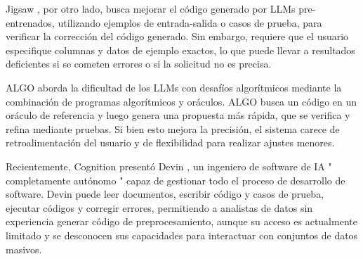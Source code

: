 Jigsaw \cite{jain2022jigsaw}, por otro lado, busca mejorar el código generado por LLMs pre-entrenados, utilizando ejemplos de entrada-salida o casos de prueba, para verificar la corrección del código generado. Sin embargo, requiere que el usuario especifique columnas y datos de ejemplo exactos, lo que puede llevar a resultados deficientes si se cometen errores o si la solicitud no es precisa.

ALGO \cite{zhang2023algo} aborda la dificultad de los LLMs con desafíos algorítmicos mediante la combinación de programas algorítmicos y oráculos. ALGO busca un código en un oráculo de referencia y luego genera una propuesta más rápida, que se verifica y refina mediante pruebas. Si bien esto mejora la precisión, el sistema carece de retroalimentación del usuario y de flexibilidad para realizar ajustes menores.

Recientemente, Cognition presentó Devin \cite{devin}, un ingeniero de software de IA " completamente autónomo " capaz de gestionar todo el proceso de desarrollo de software. Devin puede leer documentos, escribir código y casos de prueba, ejecutar códigos y corregir errores, permitiendo a analistas de datos sin experiencia generar código de preprocesamiento, aunque su acceso es actualmente limitado y se desconocen sus capacidades para interactuar con conjuntos de datos masivos.

